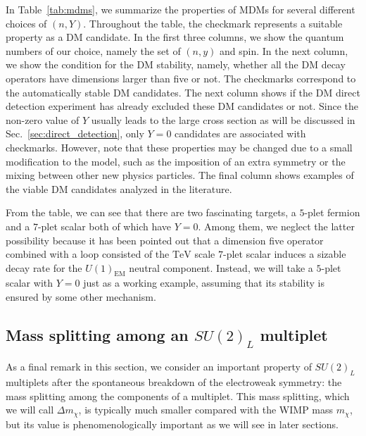 \documentclass[12pt,twoside,book]{article}
\begin{document}
In Table~\ref{tab:mdms}, we summarize the properties of MDMs for several different choices of $(n, Y)$.
Throughout the table, the checkmark represents a suitable property as a DM candidate.
In the first three columns, we show the quantum numbers of our choice, namely the set of $(n,y)$ and spin.
In the next column, we show the condition for the DM stability, namely, whether all the DM decay operators have dimensions larger than five or not.
The checkmarks correspond to the automatically stable DM candidates.
The next column shows if the DM direct detection experiment has already excluded these DM candidates or not.
Since the non-zero value of $Y$ usually leads to the large cross section as will be discussed in Sec.~\ref{sec:direct_detection}, only $Y=0$ candidates are associated with checkmarks.
However, note that these properties may be changed due to a small modification to the model, such as the imposition of an extra symmetry or the mixing between other new physics particles.
The final column shows examples of the viable DM candidates analyzed in the literature.

From the table, we can see that there are two fascinating targets, a $5$-plet fermion and a $7$-plet scalar both of which have $Y=0$.
Among them, we neglect the latter possibility because it has been pointed out \cite{DiLuzio:2015oha, DelNobile:2015bqo} that a dimension five operator combined with a loop consisted of the $\mathrm{TeV}$ scale $7$-plet scalar induces a sizable decay rate for the $U(1)_{\mathrm{EM}}$ neutral component.
Instead, we will take a $5$-plet scalar with $Y=0$ just as a working example, assuming that its stability is ensured by some other mechanism.


\subsection{Mass splitting among an $SU(2)_L$ multiplet}
\label{sec:mass_splitting}

As a final remark in this section, we consider an important property of $SU(2)_L$ multiplets after the spontaneous breakdown of the electroweak symmetry: the mass splitting among the components of a multiplet.
This mass splitting, which we will call $\Delta m_\chi$, is typically much smaller compared with the WIMP mass $m_\chi$, but its value is phenomenologically important as we will see in later sections.
\end{document}
